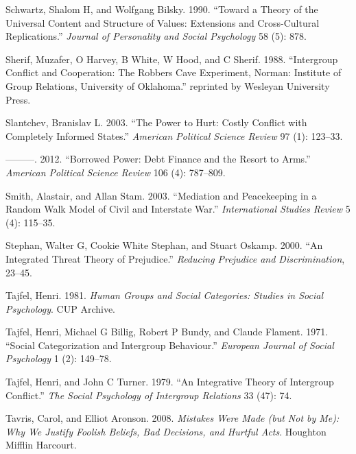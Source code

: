 \documentclass[11pt]{article}
\begin{document}
\leavevmode\hypertarget{ref-schwartz1990toward}{}%
Schwartz, Shalom H, and Wolfgang Bilsky. 1990. ``Toward a Theory of the
Universal Content and Structure of Values: Extensions and Cross-Cultural
Replications.'' \emph{Journal of Personality and Social Psychology} 58
(5): 878.

\leavevmode\hypertarget{ref-sherif1988robbersCave}{}%
Sherif, Muzafer, O Harvey, B White, W Hood, and C Sherif. 1988.
``Intergroup Conflict and Cooperation: The Robbers Cave Experiment,
Norman: Institute of Group Relations, University of Oklahoma.''
reprinted by Wesleyan University Press.

\leavevmode\hypertarget{ref-slantchev2003power}{}%
Slantchev, Branislav L. 2003. ``The Power to Hurt: Costly Conflict with
Completely Informed States.'' \emph{American Political Science Review}
97 (1): 123--33.

\leavevmode\hypertarget{ref-slantchev2012borrowed}{}%
---------. 2012. ``Borrowed Power: Debt Finance and the Resort to
Arms.'' \emph{American Political Science Review} 106 (4): 787--809.

\leavevmode\hypertarget{ref-smith2003mediation}{}%
Smith, Alastair, and Allan Stam. 2003. ``Mediation and Peacekeeping in a
Random Walk Model of Civil and Interstate War.'' \emph{International
Studies Review} 5 (4): 115--35.

\leavevmode\hypertarget{ref-Stephan2000integratedThreat}{}%
Stephan, Walter G, Cookie White Stephan, and Stuart Oskamp. 2000. ``An
Integrated Threat Theory of Prejudice.'' \emph{Reducing Prejudice and
Discrimination}, 23--45.

\leavevmode\hypertarget{ref-tajfel1981groups}{}%
Tajfel, Henri. 1981. \emph{Human Groups and Social Categories: Studies
in Social Psychology}. CUP Archive.

\leavevmode\hypertarget{ref-tajfel1971social}{}%
Tajfel, Henri, Michael G Billig, Robert P Bundy, and Claude Flament.
1971. ``Social Categorization and Intergroup Behaviour.'' \emph{European
Journal of Social Psychology} 1 (2): 149--78.

\leavevmode\hypertarget{ref-tajfel1979integrative}{}%
Tajfel, Henri, and John C Turner. 1979. ``An Integrative Theory of
Intergroup Conflict.'' \emph{The Social Psychology of Intergroup
Relations} 33 (47): 74.

\leavevmode\hypertarget{ref-tavris2008mistakes}{}%
Tavris, Carol, and Elliot Aronson. 2008. \emph{Mistakes Were Made (but
Not by Me): Why We Justify Foolish Beliefs, Bad Decisions, and Hurtful
Acts}. Houghton Mifflin Harcourt.
\end{document}
